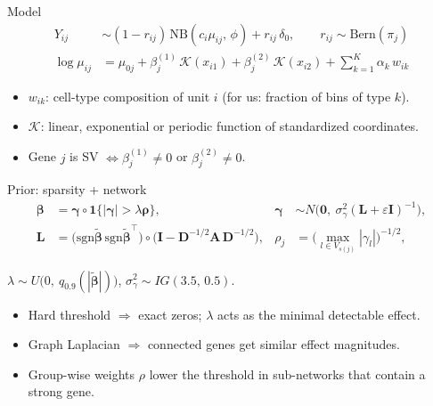 \documentclass[aspectratio=169,11pt]{beamer}
\begin{document}
\begin{frame}{Model}
  \begin{align*}
    Y_{ij} &\sim (1-r_{ij})\,\mathrm{NB}(c_i\mu_{ij},\,\phi) + r_{ij}\,\delta_0,
           \qquad r_{ij}\sim\mathrm{Bern}(\pi_j)\\[2mm]
    \log\mu_{ij} &= \mu_{0j} + \beta^{(1)}_j\,\mathcal K(x_{i1}) + \beta^{(2)}_j\,\mathcal K(x_{i2})
           + \textstyle\sum_{k=1}^{K}\alpha_k\,w_{ik}
  \end{align*}
  \begin{itemize}
    \item $w_{ik}$: cell-type composition of unit $i$ (for us: fraction of bins of type $k$).
    \item $\mathcal K$: linear, exponential or periodic function of standardized coordinates.
    \item Gene $j$ is SV $\iff \beta^{(1)}_j\neq0$ or $\beta^{(2)}_j\neq0$.
  \end{itemize}
\end{frame}

\begin{frame}{Prior: sparsity + network}
  \begin{align*}
    \boldsymbol\beta &= \boldsymbol\gamma\circ\mathbf 1\{|\boldsymbol\gamma|>\lambda\boldsymbol\rho\},
    &\boldsymbol\gamma &\sim N\big(\mathbf 0,\ \sigma^2_\gamma(\mathbf L+\varepsilon\mathbf I)^{-1}\big),\\
    \mathbf L &= \big(\mathrm{sgn}\tilde{\boldsymbol\beta}\,\mathrm{sgn}\tilde{\boldsymbol\beta}^{\top}\big)\circ
       \big(\mathbf I-\mathbf D^{-1/2}\mathbf A\,\mathbf D^{-1/2}\big),
    &\rho_j &= \Big(\max_{l\in V_{s(j)}}|\gamma_l|\Big)^{-1/2},
  \end{align*}
  \centerline{$\lambda\sim U\big(0,\ q_{0.9}(|\tilde{\boldsymbol\beta}|)\big)$, \quad
  $\sigma^2_\gamma\sim IG(3.5,\,0.5)$.}
  \begin{itemize}
    \item Hard threshold $\Rightarrow$ exact zeros; $\lambda$ acts as the minimal detectable effect.
    \item Graph Laplacian $\Rightarrow$ connected genes get similar effect magnitudes.
    \item Group-wise weights $\rho$ lower the threshold in sub-networks that contain a strong gene.
  \end{itemize}
\end{frame}
\end{document}

